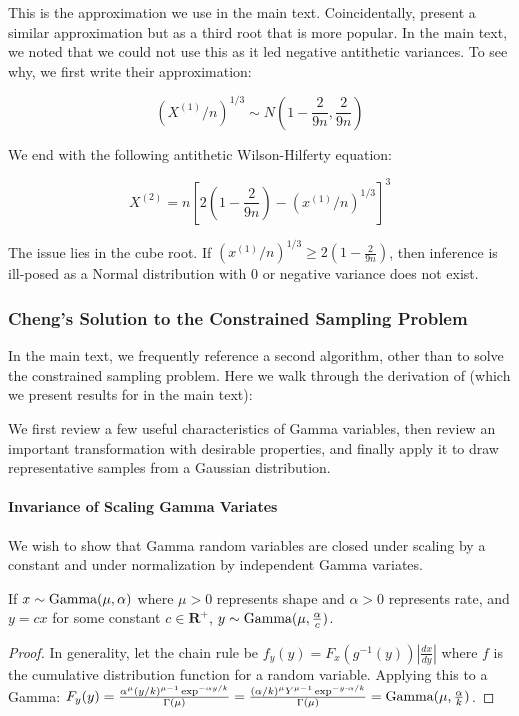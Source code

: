This is the approximation we use in the main text. Coincidentally, \cite{wilson1931distribution} present a similar approximation but as a third root that is more popular. In the main text, we noted that we could not use this as it led negative antithetic variances. To see why, we first write their approximation:

\begin{equation}
    (X^{(1)}/n)^{1/3} \sim N(1 - \frac{2}{9n}, \frac{2}{9n})
\end{equation}

We end with the following antithetic Wilson-Hilferty equation:

\begin{equation}
    X^{(2)} = n\left[2(1 - \frac{2}{9n}) - (x^{(1)}/n)^{1/3}\right]^3
\end{equation}

The issue lies in the cube root. If $(x^{(1)}/n)^{1/3} \geq 2(1 - \frac{2}{9n})$, then inference is ill-posed as a Normal distribution with 0 or negative variance does not exist.

\subsubsection{Cheng's Solution to the Constrained Sampling Problem}
\label{sec:methods}

In the main text, we frequently reference a second algorithm, other than \cite{marsaglia1980c69} to solve the constrained sampling problem. Here we walk through the derivation of \cite{cheng1984generation,pullin1979generation} (which we present results for in the main text):

We first review a few useful characteristics of Gamma variables, then review an important transformation with desirable properties, and finally apply it to draw representative samples from a Gaussian distribution.

\paragraph{Invariance of Scaling Gamma Variates}

We wish to show that Gamma random variables are closed under scaling by a constant and under normalization by independent Gamma variates.

\begin{lem} If $x \sim \textup{Gamma}(\mu, \alpha)$ where $\mu > 0$ represents shape and $\alpha > 0$ represents rate, and $y = cx$ for some constant $c \in \mathbf{R}^{+}$, $y \sim \textup{Gamma}(\mu, \frac{\alpha}{c})$.
\label{lemma:mul_gamma}
\end{lem}
\begin{proof}
In generality, let the chain rule be $f_y(y) = F_x(g^{-1}(y))|\frac{dx}{dy}|$ where $f$ is the cumulative distribution function for a random variable. Applying this to a Gamma: $F_y(y) = \frac{\alpha^{\mu}(y/k)^{\mu-1} \exp^{-\alpha y/k}}{\Gamma(\mu)} = \frac{(\alpha /k)^{\mu}Y^{\mu-1}\exp^{-y\cdot \alpha/k}}{\Gamma(\mu)} = \textup{Gamma}(\mu, \frac{\alpha}{k})$.
\end{proof}

